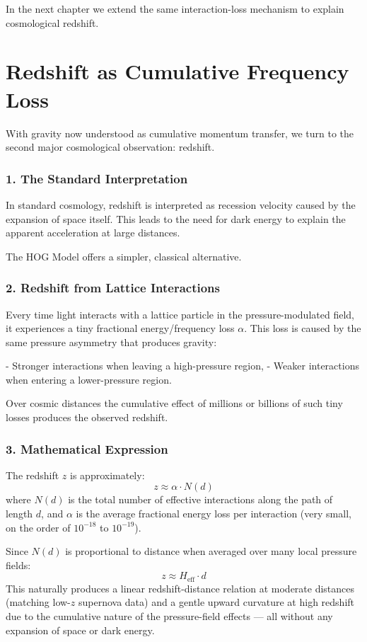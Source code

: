 \documentclass[11pt,a4paper]{book}
\begin{document}
In the next chapter we extend the same interaction-loss mechanism to explain cosmological redshift.

\chapter{Redshift as Cumulative Frequency Loss}

With gravity now understood as cumulative momentum transfer, we turn to the second major cosmological observation: redshift.

\subsection{1. The Standard Interpretation}
In standard cosmology, redshift is interpreted as recession velocity caused by the expansion of space itself. This leads to the need for dark energy to explain the apparent acceleration at large distances.

The HOG Model offers a simpler, classical alternative.

\subsection{2. Redshift from Lattice Interactions}
Every time light interacts with a lattice particle in the pressure-modulated field, it experiences a tiny fractional energy/frequency loss \( \alpha \). This loss is caused by the same pressure asymmetry that produces gravity:

- Stronger interactions when leaving a high-pressure region,
- Weaker interactions when entering a lower-pressure region.

Over cosmic distances the cumulative effect of millions or billions of such tiny losses produces the observed redshift.

\subsection{3. Mathematical Expression}
The redshift \( z \) is approximately:
\[
z \approx \alpha \cdot N(d)
\]
where \( N(d) \) is the total number of effective interactions along the path of length \( d \), and \( \alpha \) is the average fractional energy loss per interaction (very small, on the order of \( 10^{-18} \) to \( 10^{-19} \)).

Since \( N(d) \) is proportional to distance when averaged over many local pressure fields:
\[
z \approx H_{\text{eff}} \cdot d
\]
This naturally produces a linear redshift-distance relation at moderate distances (matching low-\( z \) supernova data) and a gentle upward curvature at high redshift due to the cumulative nature of the pressure-field effects — all without any expansion of space or dark energy.
\end{document}

